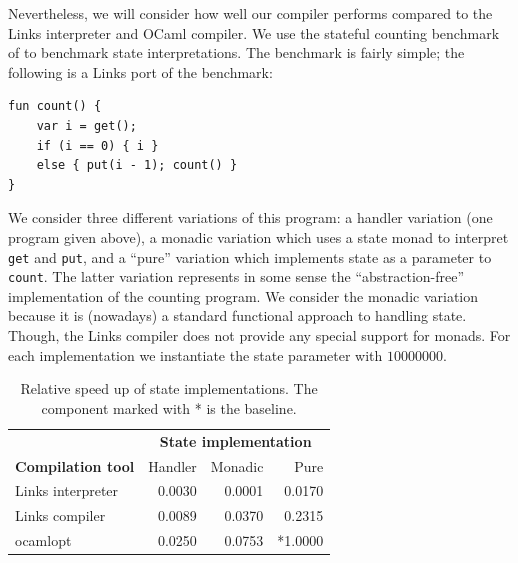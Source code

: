 \documentclass[12pt,mscres,cdtppar,twoside,openright,logo,rightchapter,normalheadings]{infthesis}
\theoremstyle{definition}
\begin{document}
Nevertheless, we will consider how well our compiler performs compared
to the Links interpreter and OCaml compiler. We use the stateful
counting benchmark of \cite{Kammar2013} to benchmark state
interpretations. The benchmark is fairly simple; the following is a
Links port of the benchmark:
\begin{lstlisting}
fun count() {
    var i = get();
    if (i == 0) { i }
    else { put(i - 1); count() }
}
\end{lstlisting}

We consider three different variations of this program: a handler
variation (one program given above), a monadic variation which uses a
state monad to interpret \lstinline$get$ and \lstinline$put$, and a
``pure'' variation which implements state as a parameter to
\lstinline$count$. The latter variation represents in some sense the
``abstraction-free'' implementation of the counting program. We
consider the monadic variation because it is (nowadays) a standard
functional approach to handling state. Though, the Links compiler does
not provide any special support for monads. For each implementation we
instantiate the state parameter with $10000000$.

\begin{table}
\centering
\begin{tabular}{| l || r | r | r |}
\cline{2-4}
\multicolumn{1}{c|}{~} & \multicolumn{3}{c|}{\textbf{State implementation}} \\
\cline{1-4}
\multicolumn{1}{|l||}{\textbf{Compilation tool}}  & Handler & Monadic & Pure \\
\hline
  Links interpreter & 0.0030   & 0.0001  & 0.0170 \\
\hline
  Links compiler    & 0.0089   & 0.0370 & 0.2315 \\
\hline
  ocamlopt          & 0.0250   & 0.0753  & *1.0000 \\
\hline
\end{tabular}
\caption{Relative speed up of state implementations. The component
  marked with * is the baseline.}\label{tbl:state-all}
\end{table}
\end{document}
